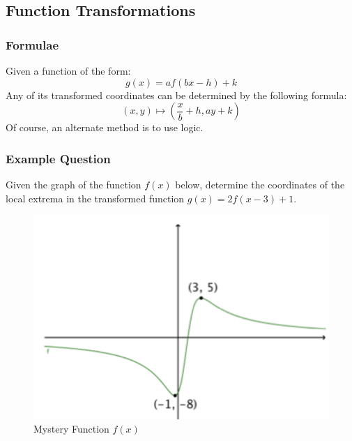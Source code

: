 \documentclass{beamer}
\begin{document}
    \subsection{Function Transformations}
    \begin{frame}
        \frametitle{Formulae}
        Given a function of the form:
        $$
            g(x) = af(bx-h) + k
        $$
        Any of its transformed coordinates can be determined by the following formula:
        $$
        (x,y) \mapsto \left(\frac{x}{b} + h , ay + k\right)
        $$
        Of course, an alternate method is to use logic.
    \end{frame}
    \begin{frame}
        \frametitle{Example Question}
        Given the graph of the function $f(x)$ below, determine the coordinates of the local extrema in the transformed function $g(x)=2f(x-3)+1$.
        \begin{figure}
            \caption{Mystery Function $f(x)$}
            \includegraphics[scale=0.3]{images/mystery-f(x).png}
        \end{figure}
    \end{frame}
\end{document}
